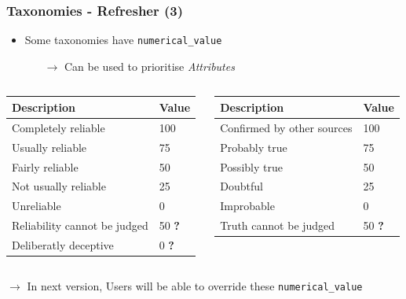\begin{frame}
    \frametitle{Taxonomies - Refresher (3)}
    \begin{itemize}
        \item Some taxonomies have \texttt{numerical\_value}
        \begin{itemize}
            \item[$\rightarrow$] Can be used to prioritise \textit{Attributes}
        \end{itemize}
    \end{itemize}
    \vspace{0.5cm}

    \begin{footnotesize}
    \begin{columns}[T] %
    \begin{column}{.40\textwidth}
        \begin{tabular}{|ll|}
            \hline
            \textbf{Description} & \textbf{Value}\\
            \hline
            Completely reliable & 100\\
            Usually reliable & 75\\
            Fairly reliable & 50\\
            Not usually reliable & 25\\
            Unreliable & 0\\
            Reliability cannot be judged & 50 \textbf{\color{red}?}\\
            Deliberatly deceptive & 0 \textbf{\color{red}?}\\
            \hline
        \end{tabular}
    \end{column}%
    \hfill%
    \begin{column}{.48\textwidth}
        \begin{tabular}{|ll|}
            \hline
            \textbf{Description} & \textbf{Value}\\
            \hline
            Confirmed by other sources & 100\\
            Probably true & 75\\
            Possibly true & 50\\
            Doubtful & 25\\
            Improbable & 0\\
            Truth cannot be judged & 50 \textbf{\color{red}?}\\
            \hline
        \end{tabular}
    \end{column}%
    \end{columns}
    \end{footnotesize}

    \vspace{0.5cm}
    $\rightarrow$ In next version, Users will be able to override these \texttt{numerical\_value}
\end{frame}


